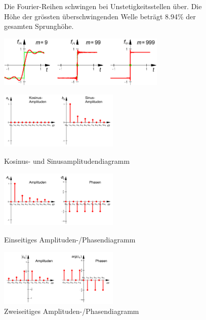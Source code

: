 
\begin{figure}[htbp]
	\begin{minipage}[c]{8cm}
		Die Fourier-Reihen schwingen bei Unstetigkeitsstellen über. Die Höhe der grössten überschwingenden Welle
		beträgt 8.94\% der gesamten Sprunghöhe.
	\end{minipage}
	\begin{minipage}[c]{8cm}
		\includegraphics[width=8cm]{./bilder/gibssches_phaenomen.png}  
	\end{minipage}
\end{figure}


\begin{figure}[htbp]
	\centering
	\begin{minipage}[b]{5.7cm}
		\includegraphics[width=5.7cm]{./bilder/spektren_cossin.png}
		\caption{Kosinus- und Sinusamplitudendiagramm} 
	\end{minipage}
	\hspace{0.5cm}
	\begin{minipage}[b]{5.7cm}
		\includegraphics[width=5.7cm]{./bilder/spektren_einseitig.png} 
		\caption{Einseitiges Amplituden-/Phasendiagramm} 
	\end{minipage}
	\hspace{0.5cm}
	\begin{minipage}[b]{5.7cm}
		\includegraphics[width=5.7cm]{./bilder/spektren_zweiseitig.png} 
		\caption{Zweiseitiges Amplituden-/Phasendiagramm} 
	\end{minipage}
\end{figure}

